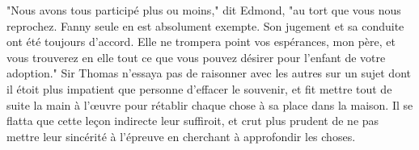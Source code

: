 "Nous avons tous participé plus ou moins," dit Edmond, "au tort que vous nous reprochez. Fanny seule en est absolument exempte. Son jugement et sa conduite ont été toujours d'accord. Elle ne trompera point vos espérances, mon père, et vous trouverez en elle tout ce que vous pouvez désirer pour l'enfant de votre adoption."
Sir Thomas n'essaya pas de raisonner avec les autres sur un sujet dont il étoit plus impatient que personne d'effacer le souvenir, et fit mettre tout de suite la main à l'œuvre pour rétablir chaque chose à sa place dans la maison. Il se flatta que cette leçon indirecte leur suffiroit, et crut plus prudent de ne pas mettre leur sincérité à l'épreuve en cherchant à approfondir les choses.